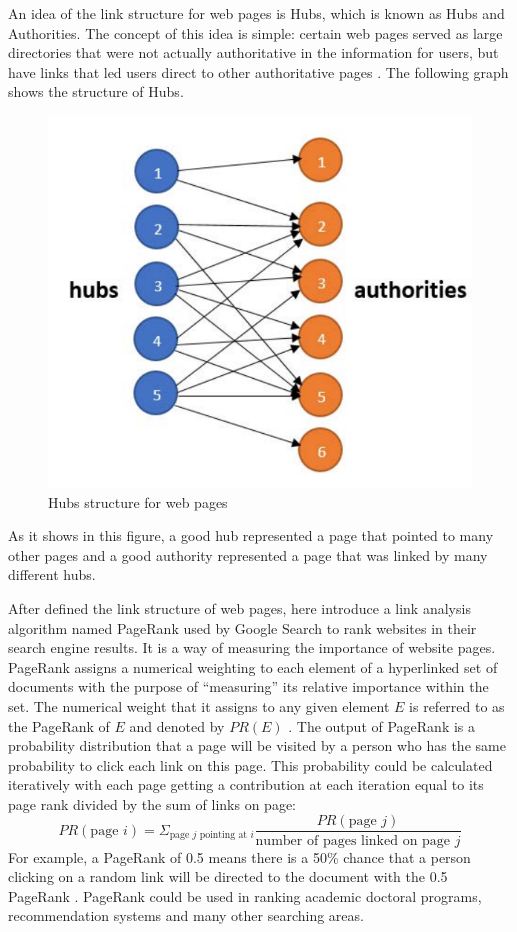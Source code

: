 \documentclass[sigconf]{acmart}
\begin{document}
An idea of the link structure for web pages is Hubs, which is known as Hubs and Authorities. The concept of this idea is simple: certain web pages served as large directories that were not actually authoritative in the information for users, but have links that led users direct to other authoritative pages \cite{editor09}. The following graph shows the structure of Hubs.
\begin{figure}
\includegraphics[width=0.30\columnwidth]{images/Hubs_structure}
\caption{Hubs structure for web pages}
\end{figure}
As it shows in this figure, a good hub represented a page that pointed to many other pages and a good authority represented a page that was linked by many different hubs.

After defined the link structure of web pages, here introduce a link analysis algorithm named PageRank used by Google Search to rank websites in their search engine results. It is a way of measuring the importance of website pages. PageRank assigns a numerical weighting to each element of a hyperlinked set of documents with the purpose of ``measuring'' its relative importance within the set. The numerical weight that it assigns to any given element $E$ is referred to as the PageRank of $E$ and denoted by $PR(E)$ \cite{editor10}. The output of PageRank is a probability distribution that a page will be visited by a person who has the same probability to click each link on this page. This probability could be calculated iteratively with each page getting a contribution at each iteration equal to its page rank divided by the sum of links on page:
\[PR(\text{page } i)=\Sigma_{\text{page } j \text{ pointing at } i}\dfrac{PR(\text{page } j)}{\text{number of pages linked on page } j}\]
For example, a PageRank of 0.5 means there is a 50\% chance that a person clicking on a random link will be directed to the document with the 0.5 PageRank \cite{editor10}. PageRank could be used in ranking academic doctoral programs, recommendation systems and many other searching areas.
    
\end{document}
